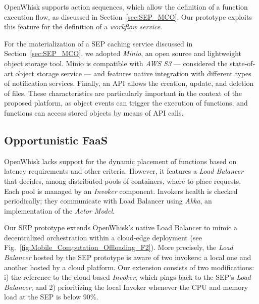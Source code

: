 OpenWhisk supports action sequences, which allow the definition of a function execution flow, as discussed in Section~\ref{sec:SEP_MCO}. Our prototype exploits this feature for the definition of a \textit{workflow service}. 

For the materialization of a SEP caching service discussed in Section~\ref{sec:SEP_MCO}, we adopted \textit{Minio}, an open source and lightweight object storage tool. Minio is compatible with \textit{AWS S3} --- considered the state-of-art object storage service --- and features native integration with different types of notification services. Finally, an API allows the creation, update, and deletion of files. These characteristics are particularly important in the context of the proposed platform, as object events can trigger the execution of functions, and functions can access stored objects by means of API calls.




\subsection{Opportunistic FaaS}



OpenWhisk lacks support for the dynamic placement of functions based on latency requirements and other criteria. However, it features a \textit{Load Balancer} that decides, among distributed pools of containers, where to place requests. Each pool is managed by an \textit{Invoker} component. Invokers health is checked periodically; they communicate with Load Balancer using \textit{Akka}, an implementation of the \textit{Actor Model}.

Our SEP prototype extends OpenWhisk's native Load Balancer to mimic a decentralized orchestration within a cloud-edge deployment (see Fig.~\ref{fig:Mobile_Computation_Offloading_F2}). More precisely, the \textit{Load Balancer} hosted by the SEP prototype is aware of two invokers: a local one and another hosted by a cloud platform. Our extension consists of two modifications: i) the reference to the cloud-based \textit{Invoker}, which pings back to the SEP's \textit{Load Balancer}; and 2) prioritizing the local Invoker whenever the CPU and memory load at the SEP is below 90\%.   


